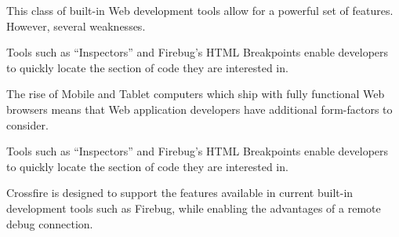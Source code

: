 This class of built-in Web development tools allow for a powerful set of
features.  However, several weaknesses.

Tools such as ``Inspectors'' and Firebug's HTML Breakpoints\cite{jjb-www2010}
enable developers to quickly locate the section of code they are interested in.

The rise of Mobile and Tablet computers which ship with fully functional Web
browsers means that Web application developers have additional form-factors to
consider.

Tools such as ``Inspectors'' and Firebug's HTML Breakpoints\cite{jjb-www2010}
enable developers to quickly locate the section of code they are interested in.

Crossfire is designed to support the features available in current built-in
development tools such as Firebug, while enabling the advantages of a remote
debug connection.


